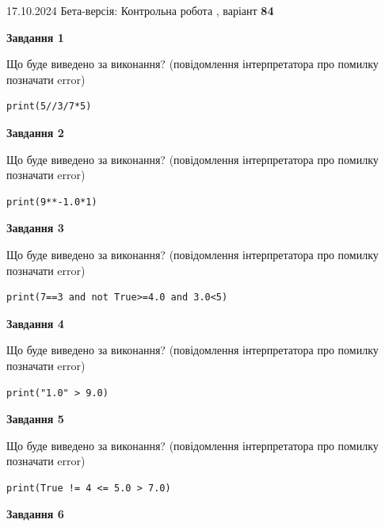 \documentclass[12pt, ukrainian]{article}
\begin{document}
{\Large{17.10.2024 Бета-версія: Контрольна робота , варіант  \No \textbf { 84 }\par}}
{
\begin {large}
{\begin {center}\textbf{Завдання 1}\end {center}}

Що буде виведено за виконання? (повідомлення інтерпретатора про помилку позначати error)\par
\begin{verbatim}
print(5//3/7*5)
\end{verbatim}

{\begin {center}\textbf{Завдання 2}\end {center}}

Що буде виведено за виконання? (повідомлення інтерпретатора про помилку позначати error)\par
\begin{verbatim}
print(9**-1.0*1)
\end{verbatim}

{\begin {center}\textbf{Завдання 3}\end {center}}

Що буде виведено за виконання? (повідомлення інтерпретатора про помилку позначати error)\par
\begin{verbatim}
print(7==3 and not True>=4.0 and 3.0<5)
\end{verbatim}

{\begin {center}\textbf{Завдання 4}\end {center}}

Що буде виведено за виконання? (повідомлення інтерпретатора про помилку позначати error)\par
\begin{verbatim}
print("1.0" > 9.0)
\end{verbatim}

{\begin {center}\textbf{Завдання 5}\end {center}}

Що буде виведено за виконання? (повідомлення інтерпретатора про помилку позначати error)\par
\begin{verbatim}
print(True != 4 <= 5.0 > 7.0)
\end{verbatim}

{\begin {center}\textbf{Завдання 6}\end {center}}


\end{large}}
\end{document}
